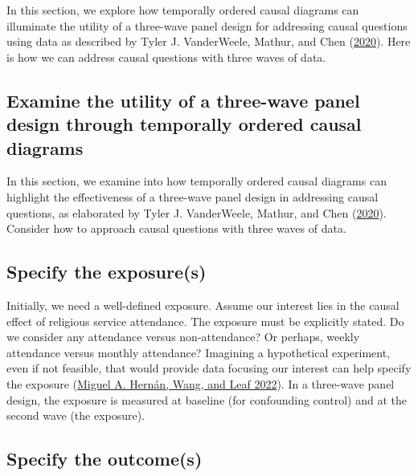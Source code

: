 \documentclass[
  singlecolumn]{report}
\begin{document}
In this section, we explore how temporally ordered causal diagrams can
illuminate the utility of a three-wave panel design for addressing
causal questions using data as described by Tyler J. VanderWeele,
Mathur, and Chen (\protect\hyperlink{ref-vanderweele2020}{2020}). Here
is how we can address causal questions with three waves of data.

\hypertarget{examine-the-utility-of-a-three-wave-panel-design-through-temporally-ordered-causal-diagrams}{%
\subsection{\texorpdfstring{\textbf{Examine the utility of a three-wave
panel design through temporally ordered causal
diagrams}}{Examine the utility of a three-wave panel design through temporally ordered causal diagrams}}\label{examine-the-utility-of-a-three-wave-panel-design-through-temporally-ordered-causal-diagrams}}

In this section, we examine into how temporally ordered causal diagrams
can highlight the effectiveness of a three-wave panel design in
addressing causal questions, as elaborated by Tyler J. VanderWeele,
Mathur, and Chen (\protect\hyperlink{ref-vanderweele2020}{2020}).
Consider how to approach causal questions with three waves of data.

\hypertarget{specify-the-exposures}{%
\subsection{\texorpdfstring{\textbf{Specify the
exposure(s)}}{Specify the exposure(s)}}\label{specify-the-exposures}}

Initially, we need a well-defined exposure. Assume our interest lies in
the causal effect of religious service attendance. The exposure must be
explicitly stated. Do we consider any attendance versus non-attendance?
Or perhaps, weekly attendance versus monthly attendance? Imagining a
hypothetical experiment, even if not feasible, that would provide data
focusing our interest can help specify the exposure
(\protect\hyperlink{ref-hernuxe1n2022a}{Miguel A. Hernán, Wang, and Leaf
2022}). In a three-wave panel design, the exposure is measured at
baseline (for confounding control) and at the second wave (the
exposure).

\hypertarget{specify-the-outcomes}{%
\subsection{\texorpdfstring{\textbf{Specify the
outcome(s)}}{Specify the outcome(s)}}\label{specify-the-outcomes}}
\end{document}

